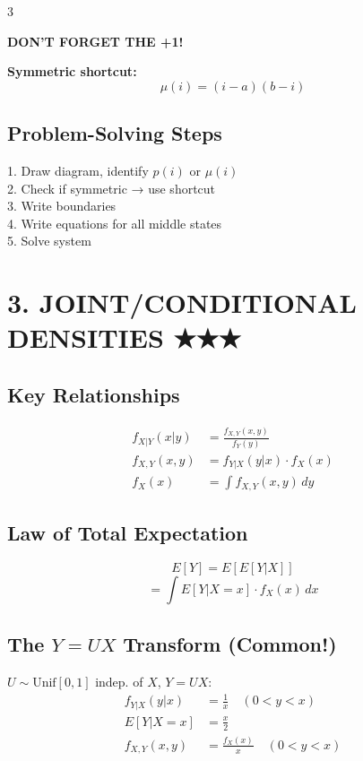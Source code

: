 \documentclass[7pt,landscape]{extarticle}
\begin{document}
\begin{multicols}{3}
\begin{compactbox}
\textcolor{critical}{\textbf{DON'T FORGET THE +1!}}
\end{compactbox}

\textbf{Symmetric shortcut:}
$$\boxed{\mu(i) = (i-a)(b-i)}$$

\subsection*{Problem-Solving Steps}
1. Draw diagram, identify $p(i)$ or $\mu(i)$ \\
2. Check if symmetric → use shortcut \\
3. Write boundaries \\
4. Write equations for all middle states \\
5. Solve system

\section*{3. JOINT/CONDITIONAL DENSITIES ★★★}

\subsection*{Key Relationships}
\begin{align*}
f_{X|Y}(x|y) &= \frac{f_{X,Y}(x,y)}{f_Y(y)} \\
f_{X,Y}(x,y) &= f_{Y|X}(y|x) \cdot f_X(x) \\
f_X(x) &= \int f_{X,Y}(x,y) \, dy
\end{align*}

\subsection*{Law of Total Expectation}
\begin{compactbox}
$$\boxed{E[Y] = E[E[Y|X]]}$$
$$= \int E[Y|X=x] \cdot f_X(x) \, dx$$
\end{compactbox}

\subsection*{The $Y = UX$ Transform (Common!)}
$U \sim \text{Unif}[0,1]$ indep. of $X$, $Y = UX$:
\begin{align*}
f_{Y|X}(y|x) &= \frac{1}{x} \quad (0 < y < x) \\
E[Y|X=x] &= \frac{x}{2} \\
f_{X,Y}(x,y) &= \frac{f_X(x)}{x} \quad (0 < y < x)
\end{align*}


\end{multicols}
\end{document}
